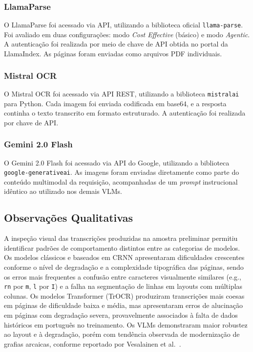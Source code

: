 \documentclass[
  12pt,
  oneside,
  a4paper,
  chapter=TITLE,
  section=TITLE,
  english,
  brazil
]{abntex2}
\begin{document}
\subsubsection{LlamaParse}

O LlamaParse foi acessado via API, utilizando a biblioteca oficial
\texttt{llama-parse}. Foi avaliado em duas configurações: modo \textit{Cost Effective}
(básico) e modo \textit{Agentic}. A autenticação foi realizada por meio de chave de
API obtida no portal da LlamaIndex. As páginas foram enviadas como arquivos PDF
individuais.

\subsubsection{Mistral OCR}

O Mistral OCR foi acessado via API REST, utilizando a biblioteca \texttt{mistralai}
para Python. Cada imagem foi enviada codificada em base64, e a resposta continha o
texto transcrito em formato estruturado. A autenticação foi realizada por chave de
API.

\subsubsection{Gemini 2.0 Flash}

O Gemini 2.0 Flash foi acessado via API do Google, utilizando a biblioteca
\texttt{google-generativeai}. As imagens foram enviadas diretamente como parte do
conteúdo multimodal da requisição, acompanhadas de um \textit{prompt} instrucional
idêntico ao utilizado nos demais VLMs.

\subsection{Observações Qualitativas}

A inspeção visual das transcrições produzidas na amostra preliminar permitiu
identificar padrões de comportamento distintos entre as categorias de modelos. Os
modelos clássicos e baseados em CRNN apresentaram dificuldades crescentes conforme
o nível de degradação e a complexidade tipográfica das páginas, sendo os erros mais
frequentes a confusão entre caracteres visualmente similares (e.g., \texttt{rn} por
\texttt{m}, \texttt{l} por \texttt{I}) e a falha na segmentação de linhas em layouts
com múltiplas colunas. Os modelos Transformer (TrOCR) produziram transcrições mais
coesas em páginas de dificuldade baixa e média, mas apresentaram erros de alucinação
em páginas com degradação severa, provavelmente associados à falta de dados históricos
em português no treinamento. Os VLMs demonstraram maior robustez ao layout e à
degradação, porém com tendência observada de modernização de grafias arcaicas,
conforme reportado por Vesalainen et al.\ \cite{vesalainen2025}.
\end{document}
